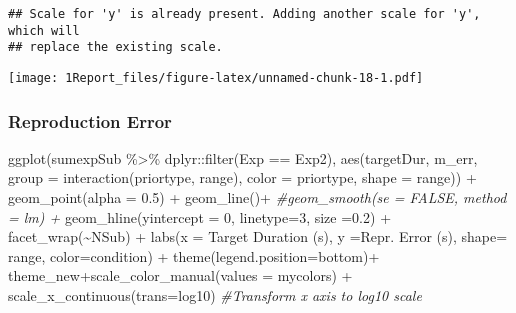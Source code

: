 \documentclass[
]{article}
\newenvironment{Shaded}{\begin{snugshade}}{\end{snugshade}}
\newcommand{\AttributeTok}[1]{\textcolor[rgb]{0.77,0.63,0.00}{#1}}
\newcommand{\CommentTok}[1]{\textcolor[rgb]{0.56,0.35,0.01}{\textit{#1}}}
\newcommand{\DecValTok}[1]{\textcolor[rgb]{0.00,0.00,0.81}{#1}}
\newcommand{\FloatTok}[1]{\textcolor[rgb]{0.00,0.00,0.81}{#1}}
\newcommand{\FunctionTok}[1]{\textcolor[rgb]{0.00,0.00,0.00}{#1}}
\newcommand{\NormalTok}[1]{#1}
\newcommand{\SpecialCharTok}[1]{\textcolor[rgb]{0.00,0.00,0.00}{#1}}
\newcommand{\StringTok}[1]{\textcolor[rgb]{0.31,0.60,0.02}{#1}}
\begin{document}
\begin{verbatim}
## Scale for 'y' is already present. Adding another scale for 'y', which will
## replace the existing scale.
\end{verbatim}

\texttt{[image: 1Report\_files/figure-latex/unnamed-chunk-18-1.pdf]}

\hypertarget{reproduction-error-1}{%
\subsubsection{Reproduction Error}\label{reproduction-error-1}}

\begin{Shaded}
\begin{Highlighting}[]
\FunctionTok{ggplot}\NormalTok{(sumexpSub }\SpecialCharTok{\%\textgreater{}\%}\NormalTok{ dplyr}\SpecialCharTok{::}\FunctionTok{filter}\NormalTok{(Exp }\SpecialCharTok{==} \StringTok{\textquotesingle{}Exp2\textquotesingle{}}\NormalTok{), }\FunctionTok{aes}\NormalTok{(targetDur, m\_err, }\AttributeTok{group =} \FunctionTok{interaction}\NormalTok{(priortype, range), }\AttributeTok{color =}\NormalTok{ priortype, }\AttributeTok{shape =}\NormalTok{ range)) }\SpecialCharTok{+} 
  \FunctionTok{geom\_point}\NormalTok{(}\AttributeTok{alpha =} \FloatTok{0.5}\NormalTok{) }\SpecialCharTok{+} 
  \FunctionTok{geom\_line}\NormalTok{()}\SpecialCharTok{+}
  \CommentTok{\#geom\_smooth(se = FALSE, method = \textquotesingle{}lm\textquotesingle{}) + }
  \FunctionTok{geom\_hline}\NormalTok{(}\AttributeTok{yintercept =} \DecValTok{0}\NormalTok{, }\AttributeTok{linetype=}\DecValTok{3}\NormalTok{, }\AttributeTok{size =}\FloatTok{0.2}\NormalTok{) }\SpecialCharTok{+}
  \FunctionTok{facet\_wrap}\NormalTok{(}\SpecialCharTok{\textasciitilde{}}\NormalTok{NSub) }\SpecialCharTok{+}
  \FunctionTok{labs}\NormalTok{(}\AttributeTok{x =} \StringTok{\textquotesingle{}Target Duration (s)\textquotesingle{}}\NormalTok{, }\AttributeTok{y =}\StringTok{\textquotesingle{}Repr. Error (s)\textquotesingle{}}\NormalTok{, }\AttributeTok{shape=} \StringTok{\textquotesingle{}range\textquotesingle{}}\NormalTok{, }\AttributeTok{color=}\StringTok{\textquotesingle{}condition\textquotesingle{}}\NormalTok{) }\SpecialCharTok{+} \FunctionTok{theme}\NormalTok{(}\AttributeTok{legend.position=}\StringTok{\textquotesingle{}bottom\textquotesingle{}}\NormalTok{)}\SpecialCharTok{+} 
\NormalTok{  theme\_new}\SpecialCharTok{+}\FunctionTok{scale\_color\_manual}\NormalTok{(}\AttributeTok{values =}\NormalTok{ mycolors) }\SpecialCharTok{+}
  \FunctionTok{scale\_x\_continuous}\NormalTok{(}\AttributeTok{trans=}\StringTok{\textquotesingle{}log10\textquotesingle{}}\NormalTok{) }\CommentTok{\#Transform x axis to log10 scale}
\end{Highlighting}
\end{Shaded}
\end{document}
